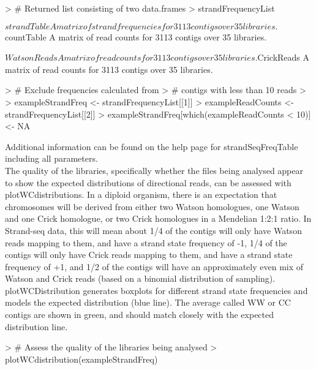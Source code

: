 \documentclass{article}
\begin{document}
\begin{Schunk}
\begin{Sinput}
> # Returned list consisting of two data.frames
> strandFrequencyList
\end{Sinput}
\begin{Soutput}
$strandTable
A matrix of strand frequencies for  3113  contigs over  35  libraries.

$countTable
A matrix of read counts for  3113  contigs over  35  libraries.

$WatsonReads
A matrix of read counts for  3113  contigs over  35  libraries.

$CrickReads
A matrix of read counts for  3113  contigs over  35  libraries.
\end{Soutput}
\begin{Sinput}
> # Exclude frequencies calculated from
> # contigs with less than 10 reads
> 
> exampleStrandFreq <- strandFrequencyList[[1]]
> exampleReadCounts <- strandFrequencyList[[2]]
> exampleStrandFreq[which(exampleReadCounts < 10)] <- NA 
\end{Sinput}
\end{Schunk}

Additional information can be found on the help page for strandSeqFreqTable including all parameters.\\

The quality of the libraries, specifically whether the files being analysed appear to show the expected distributions of directional reads, can be assessed with plotWCdistributions.  In a diploid organism, there is an expectation that chromosomes will be derived from either two Watson homologues, one Watson and one Crick homologue, or two Crick homologues in a Mendelian 1:2:1 ratio.  In Strand-seq data, this will mean about 1/4 of the contigs will only have Watson reads mapping to them, and have a strand state frequency of -1, 1/4 of the contigs will only have Crick reads mapping to them, and have a strand state frequency of +1, and 1/2 of the contigs will have an approximately even mix of Watson and Crick reads (based on a binomial distribution of sampling).  plotWCDistribution generates boxplots for different strand state frequencies and models the expected distribution (blue line). The average called WW or CC contigs are shown in green, and should match closely with the expected distribution line.

\begin{Schunk}
\begin{Sinput}
> # Assess the quality of the libraries being analysed
> plotWCdistribution(exampleStrandFreq)
\end{Sinput}
\end{Schunk}
\end{document}
